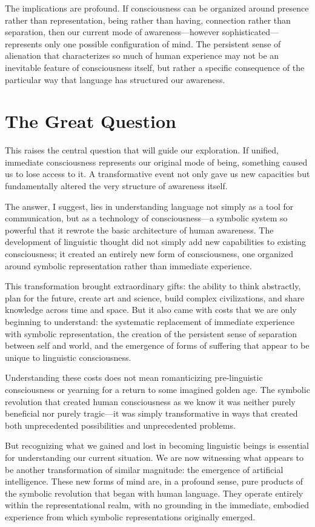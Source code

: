 The implications are profound. If consciousness can be organized around presence rather than representation, being rather than having, connection rather than separation, then our current mode of awareness—however sophisticated—represents only one possible configuration of mind. The persistent sense of alienation that characterizes so much of human experience may not be an inevitable feature of consciousness itself, but rather a specific consequence of the particular way that language has structured our awareness.

\section{The Great Question}

This raises the central question that will guide our exploration. If unified, immediate consciousness represents our original mode of being, something caused us to lose access to it. A transformative event not only gave us new capacities but fundamentally altered the very structure of awareness itself.

The answer, I suggest, lies in understanding language not simply as a tool for communication, but as a technology of consciousness—a symbolic system so powerful that it rewrote the basic architecture of human awareness. The development of linguistic thought did not simply add new capabilities to existing consciousness; it created an entirely new form of consciousness, one organized around symbolic representation rather than immediate experience.

This transformation brought extraordinary gifts: the ability to think abstractly, plan for the future, create art and science, build complex civilizations, and share knowledge across time and space. But it also came with costs that we are only beginning to understand: the systematic replacement of immediate experience with symbolic representation, the creation of the persistent sense of separation between self and world, and the emergence of forms of suffering that appear to be unique to linguistic consciousness.

Understanding these costs does not mean romanticizing pre-linguistic consciousness or yearning for a return to some imagined golden age. The symbolic revolution that created human consciousness as we know it was neither purely beneficial nor purely tragic—it was simply transformative in ways that created both unprecedented possibilities and unprecedented problems.

But recognizing what we gained and lost in becoming linguistic beings is essential for understanding our current situation. We are now witnessing what appears to be another transformation of similar magnitude: the emergence of artificial intelligence. These new forms of mind are, in a profound sense, pure products of the symbolic revolution that began with human language. They operate entirely within the representational realm, with no grounding in the immediate, embodied experience from which symbolic representations originally emerged.

